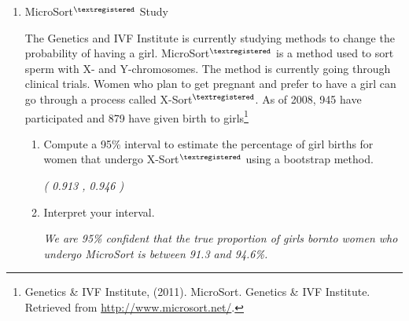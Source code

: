 \begin{enumerate}
   \item MicroSort$^{\textregistered}$ Study

     The Genetics and IVF Institute is currently studying methods to
     change the probability of having a
     girl. MicroSort$^{\textregistered}$ is a method used to sort
     sperm with X- and Y-chromosomes. The method is currently going
     through clinical trials. Women who plan to get pregnant and
     prefer to have a girl can go through a process called
     X-Sort$^{\textregistered}$. As of 2008, 945 have participated and
     879 have given birth to girls\footnote{Genetics \& IVF Institute,
       (2011). MicroSort. Genetics \& IVF Institute. Retrieved from
       \url{http://www.microsort.net/}. }
       \begin{enumerate}
       \item  Compute a 95\% interval to estimate the percentage of
         girl births for women that undergo X-Sort$^{\textregistered}$
         using a bootstrap method. 
\begin{students}
          \vspace{2cm}
\end{students}
\begin{key}
 {\it  ( 0.913 , 0.946 )}      
\end{key} 

       \item  Interpret your interval. 
\begin{students}
          \vspace{4cm}
\end{students}
\begin{key}
 {\it  We are 95\% confident that the true proportion of girls bornto
   women who undergo MicroSort is between 91.3 and 94.6\%. }      
\end{key}


\end{enumerate}
\end{enumerate}
